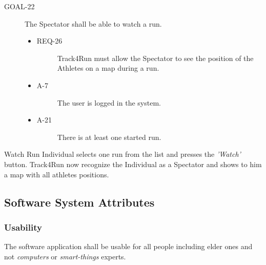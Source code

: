 \documentclass[a4paper]{article}
\newcommand{\requirement}{\ding{229}}%
\begin{document}
        \begin{description}
        	\item[GOAL-22] The Spectator shall be able to watch a run.
            	\begin{itemize}
            	    \item[\requirement]
                	\begin{description}
                	\item[REQ-26] Track4Run must allow the Spectator to see the position of the Athletes on a map during a run.
                	\end{description}
                	\item
                	\begin{description}
                	\item[A-7] The user is logged in the system.
                	\end{description}
                	\item
                	\begin{description}
                	\item[A-21] There is at least one started run.
                	\end{description}
                	\end{itemize}
        \end{description}

        \begin{usecase}{Watch Run}
              {Individual selects one run from the list and presses the \textit{'Watch'} button.}
              {Track4Run now recognize the Individual as a Spectator and shows to him a map with all athletes positions.}
        \end{usecase}
        
        
        \subsection{Software System Attributes}
        \subsubsection{Usability}
        The software application shall be usable for all people including elder ones and not \textit{computers} or \textit{smart-things} experts.
        
\end{document}
